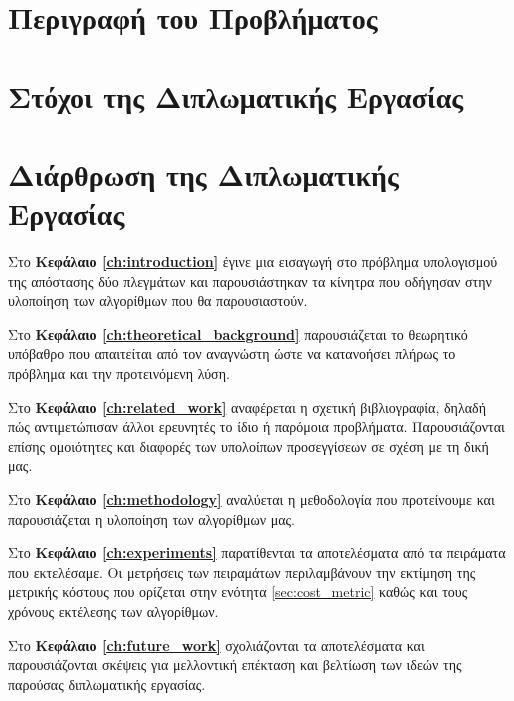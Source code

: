 \section{Περιγραφή του Προβλήματος}

\section{Στόχοι της Διπλωματικής Εργασίας}

\section{Διάρθρωση της Διπλωματικής Εργασίας}
Στο \textbf{Κεφάλαιο \ref{ch:introduction}} έγινε μια εισαγωγή στο 
πρόβλημα υπολογισμού της απόστασης δύο πλεγμάτων και παρουσιάστηκαν
τα κίνητρα που οδήγησαν στην υλοποίηση των αλγορίθμων που θα 
παρουσιαστούν. 

Στο \textbf{Κεφάλαιο \ref{ch:theoretical_background}} παρουσιάζεται το 
θεωρητικό υπόβαθρο που απαιτείται από τον αναγνώστη ώστε να κατανοήσει
πλήρως το πρόβλημα και την προτεινόμενη λύση.

Στο \textbf{Κεφάλαιο \ref{ch:related_work}} αναφέρεται η σχετική 
βιβλιογραφία, δηλαδή πώς αντιμετώπισαν άλλοι ερευνητές το ίδιο ή 
παρόμοια προβλήματα. 
Παρουσιάζονται επίσης ομοιότητες και διαφορές
των υπολοίπων προσεγγίσεων σε σχέση με τη δική μας.

Στο \textbf{Κεφάλαιο \ref{ch:methodology}} αναλύεται η μεθοδολογία 
που προτείνουμε και παρουσιάζεται η υλοποίηση των αλγορίθμων μας.

Στο \textbf{Κεφάλαιο \ref{ch:experiments}} παρατίθενται τα αποτελέσματα 
από τα πειράματα που εκτελέσαμε. 
Οι μετρήσεις των πειραμάτων περιλαμβάνουν την εκτίμηση της μετρικής 
κόστους που ορίζεται στην ενότητα \ref{sec:cost_metric} καθώς και τους χρόνους
εκτέλεσης των αλγορίθμων. 

Στο \textbf{Κεφάλαιο \ref{ch:future_work}} σχολιάζονται τα αποτελέσματα
και παρουσιάζονται σκέψεις για μελλοντική επέκταση και βελτίωση των 
ιδεών της παρούσας διπλωματικής εργασίας.
